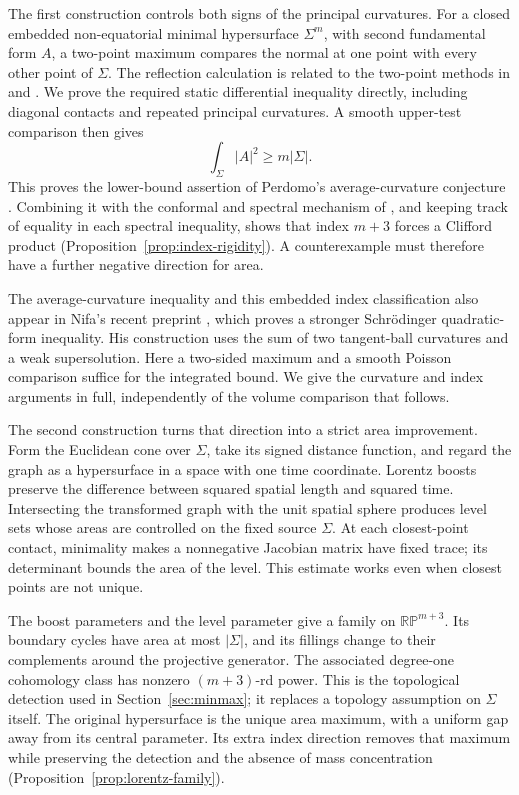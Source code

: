 The first construction controls both signs of the principal curvatures.
For a closed embedded non-equatorial minimal hypersurface \(\Sigma^m\),
with second fundamental form \(A\), a two-point maximum compares the
normal at one point with every other point of \(\Sigma\).
The reflection calculation is related to the two-point methods in
\cite[Section~2]{Brendle2013} and \cite[Section~2]{AHLW2015}.
We prove the required static differential
inequality directly, including diagonal contacts and repeated principal
curvatures. A smooth upper-test comparison then gives
\[
\int_\Sigma |A|^2\ge m|\Sigma|.
\]
This proves the lower-bound assertion of Perdomo's average-curvature
conjecture \cite[Conjecture~1.5]{GeLi2021}.
Combining it with the conformal and spectral mechanism of
\cite[Theorem~3.1]{Perdomo2004}, and keeping track of equality in each
spectral inequality, shows that index \(m+3\) forces a Clifford product
(Proposition~\ref{prop:index-rigidity}). A counterexample must
therefore have a further negative direction for area.

The average-curvature inequality and this embedded index classification
also appear in Nifa's recent preprint
\cite[Theorem~1.1 and Corollary~7.3]{Nifa2026}, which proves a stronger
Schr\"odinger quadratic-form inequality. His construction uses the sum
of two tangent-ball curvatures and a weak supersolution. Here a two-sided
maximum and a smooth Poisson comparison suffice for the integrated
bound. We give the curvature and index arguments in full, independently
of the volume comparison that follows.

The second construction turns that direction into a strict area
improvement. Form the Euclidean cone over \(\Sigma\), take its signed
distance function, and regard the graph as a hypersurface in a space
with one time coordinate. Lorentz boosts preserve the difference
between squared spatial length and squared time. Intersecting the
transformed graph with the unit spatial sphere produces level sets
whose areas are controlled on the fixed source \(\Sigma\).
At each closest-point contact, minimality makes a nonnegative Jacobian
matrix have fixed trace; its determinant bounds the area of the level.
This estimate works even when closest points are not unique.

The boost parameters and the level parameter give a family on
\(\mathbb{RP}^{m+3}\). Its boundary cycles have area at most
\(|\Sigma|\), and its fillings change to their complements around the
projective generator. The associated degree-one cohomology class has
nonzero \((m+3)\)-rd power. This is the topological detection used in
Section~\ref{sec:minmax}; it replaces a topology assumption on
\(\Sigma\) itself. The original hypersurface is the unique area
maximum, with a uniform gap away from its central parameter.
Its extra index direction removes that maximum while preserving the
detection and the absence of mass concentration
(Proposition~\ref{prop:lorentz-family}).

